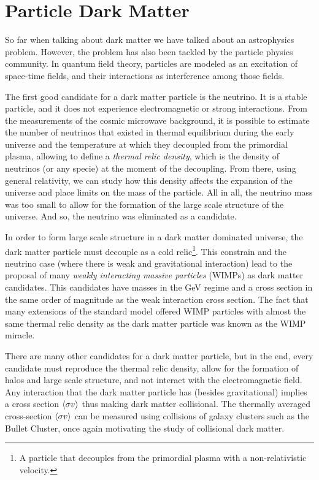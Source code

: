 \section{Particle Dark Matter}
So far when talking about dark matter we have talked about an astrophysics problem. However, the problem has also been tackled by the particle physics community. In quantum field theory, particles are modeled as an excitation of space-time fields, and their interactions as interference among those fields.

The first good candidate for a dark matter particle is the neutrino. 
It is a stable particle, and it does not experience electromagnetic or strong interactions\cite{aHistory}. 
From the measurements of the cosmic microwave background, it is possible to estimate the number of neutrinos that existed in thermal equilibrium during the early universe and the temperature at which they decoupled from the primordial plasma, allowing to define a \emph{thermal relic density}, which is the density of neutrinos (or any specie) at the moment of the decoupling. 
From there, using general relativity, we can study how this density affects the expansion of the universe and place limits on the mass of the particle\cite{Gershtein:1966gg}.
All in all, the neutrino mass was too small to allow for the formation of the large scale structure of the universe. And so, the neutrino was eliminated as a candidate. 

In order to form large scale structure in a dark matter dominated universe, the dark matter particle must decouple as a cold relic\footnote{A particle that decouples from the primordial plasma with a non-relativistic velocity.}. This constrain and the neutrino case (where there is weak and gravitational interaction) lead to the proposal of many \emph{weakly interacting massive particles} (WIMPs) as dark matter candidates. This candidates have masses in the GeV regime and a cross section in the same order of magnitude as the weak interaction cross section.  The fact that many extensions of the standard model offered WIMP particles with almost the same thermal relic density as the dark matter particle was known as the WIMP miracle.

There are many other candidates for a dark matter particle, but in the end, every candidate must reproduce the thermal relic density, allow for the formation of halos and large scale structure, and not interact with the electromagnetic field. Any interaction that the dark matter particle has (besides gravitational) implies a cross section $\langle \sigma v \rangle$ thus making dark matter collisional. The thermally averaged cross-section $\langle \sigma v \rangle$ can be measured using collisions of galaxy clusters such as the Bullet Cluster, once again motivating the study of collisional dark matter.


